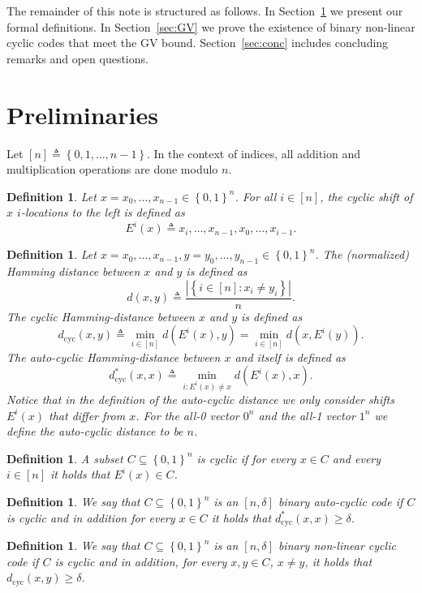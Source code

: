 \documentclass[twocolumn,twoside]{IEEEtran}
\theoremstyle{plain}
\newtheorem{defn}[thm]{Definition$\!$}
\newenvironment{definition}{\begin{defn}\hspace*{-1ex}{\bf.}}{\end{defn}}
\newcommand{\mathset}[1]{\left\{#1\right\}}
\newcommand{\abs}[1]{\left|#1\right|}
\renewcommand{\geq}{\geqslant}
\newcommand{\eqdef}{\triangleq}
\newcommand{\dc}{d_{\mathrm{cyc}}}
\begin{document}
The remainder of this note is structured as follows.  In
Section~\ref{sec:pre} we present our formal definitions.  In
Section~\ref{sec:GV} we prove the existence of binary non-linear
cyclic codes that meet the GV bound.  Section~\ref{sec:conc} includes
concluding remarks and open questions.

\section{Preliminaries}
\label{sec:pre}

Let $[n]\eqdef\mathset{0,1,\dots,n-1}$. In the context of indices, all
addition and multiplication operations are done modulo $n$.

\begin{definition}
Let $x=x_0,\dots,x_{n-1} \in \mathset{0,1}^n$. For all $i \in [n]$,
the cyclic shift of $x$ $i$-locations to the left is defined as
\[
E^i(x) \eqdef  x_{i},\dots,x_{n-1},x_0,\dots,x_{i-1}.
\]
\end{definition}

\begin{definition}
Let $x=x_0,\dots,x_{n-1} ,y=y_0,\dots,y_{n-1} \in \mathset{0,1}^n$.
The (normalized) Hamming distance between $x$ and $y$ is defined as
\[
d(x,y) \eqdef \frac{\abs{\mathset{i \in [n] : x_i \ne y_i}}}{n}.
\]
The cyclic Hamming-distance between $x$ and $y$ is defined as
\[
\dc(x,y) \eqdef \min_{i \in [n]} d(E^i(x),y) = \min_{i \in [n]} d(x,E^i(y)).
\]
The auto-cyclic Hamming-distance between $x$ and itself is defined as
\[
\dc^*(x,x) \eqdef \min_{i: E^i(x) \ne x} d(E^i(x),x).
\]
Notice that in the definition of the auto-cyclic distance we only
consider shifts $E^i(x)$ that differ from $x$. For the all-0 vector $0^n$ and the all-1 vector $1^n$ we define the auto-cyclic distance to be $n$.  
\end{definition}

\begin{definition}
A subset $C \subseteq \mathset{0,1}^n$ is \emph{cyclic} if for every
$x \in C$ and every $i \in [n]$ it holds that $E^i(x) \in C$.
\end{definition}

\begin{definition}
We say that $C \subseteq \mathset{0,1}^n$ is an $[n,\delta]$ binary
\emph{auto-cyclic code} if $C$ is cyclic and in addition for every $x
\in C$ it holds that $\dc^*(x,x) \geq \delta$.
\end{definition}

\begin{definition}
We say that $C \subseteq \mathset{0,1}^n$ is an $[n,\delta]$ binary
non-linear \emph{cyclic code} if $C$ is cyclic and in addition, for
every $x,y \in C$, $x\neq y$, it holds that $\dc(x,y) \geq \delta$.
\end{definition}
\end{document}
